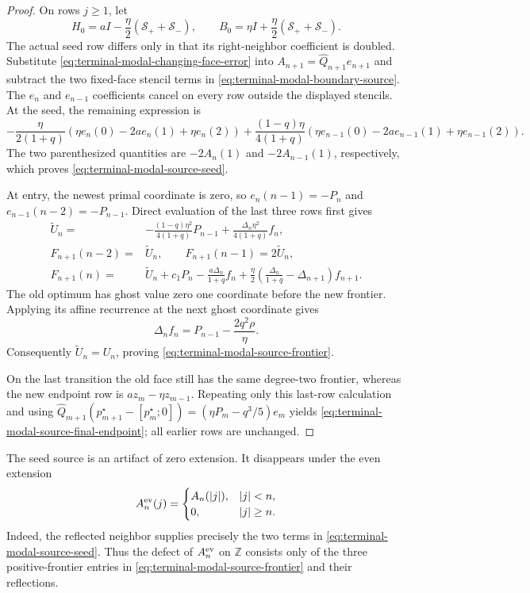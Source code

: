 \begin{proof}
On rows $j\ge1$, let
\[
 H_0=aI-\frac\eta2(\mathcal S_++\mathcal S_-),
 \qquad
 B_0=\eta I+\frac\eta2(\mathcal S_++\mathcal S_-).
\]
The actual seed row differs only in that its right-neighbor coefficient is
doubled.  Substitute
\eqref{eq:terminal-modal-changing-face-error} into
$A_{n+1}=\widehat Q_{n+1}e_{n+1}$ and subtract the two fixed-face stencil
terms in \eqref{eq:terminal-modal-boundary-source}.  The $e_n$ and
$e_{n-1}$ coefficients cancel on every row outside the displayed stencils.
At the seed, the remaining expression is
\[
 -\frac{\eta}{2(1+q)}
  (\eta e_n(0)-2ae_n(1)+\eta e_n(2))
 +\frac{(1-q)\eta}{4(1+q)}
  (\eta e_{n-1}(0)-2ae_{n-1}(1)+\eta e_{n-1}(2)).
\]
The two parenthesized quantities are $-2A_n(1)$ and
$-2A_{n-1}(1)$, respectively, which proves
\eqref{eq:terminal-modal-source-seed}.

At entry, the newest primal coordinate is zero, so
$e_n(n-1)=-P_n$ and $e_{n-1}(n-2)=-P_{n-1}$.  Direct evaluation of the last
three rows first gives
\[
 \begin{split}
 \widetilde U_n={}&
 -\frac{(1-q)\eta^2}{4(1+q)}P_{n-1}
 +\frac{\Delta_n\eta^2}{4(1+q)}f_n,\\
 F_{n+1}(n-2)={}&\widetilde U_n,\qquad
 F_{n+1}(n-1)=2\widetilde U_n,\\
 F_{n+1}(n)={}&\widetilde U_n+c_1P_n
 -\frac{a\Delta_n}{1+q}f_n
 +\frac\eta2\left(\frac{\Delta_n}{1+q}-\Delta_{n+1}\right)f_{n+1}.
 \end{split}
\]
The old optimum has ghost value zero one coordinate before the new
frontier.  Applying its affine recurrence at the next ghost coordinate gives
\begin{equation}
 \Delta_nf_n=P_{n-1}-\frac{2q^2\rho}{\eta}.
 \label{eq:terminal-modal-source-ghost-identity}
\end{equation}
Consequently $\widetilde U_n=U_n$, proving
\eqref{eq:terminal-modal-source-frontier}.

On the last transition the old face still has the same degree-two frontier,
whereas the new endpoint row is $az_m-\eta z_{m-1}$.  Repeating only this
last-row calculation and using
$\widehat Q_{m+1}(p_{m+1}^\star-[p_m^\star;0])
=(\eta P_m-q^3/5)e_m$ yields
\eqref{eq:terminal-modal-source-final-endpoint}; all earlier rows are
unchanged.
\end{proof}

The seed source is an artifact of zero extension.  It disappears under the
even extension
\begin{equation}
 A_n^{\rm ev}(j)=
 \begin{cases}
  A_n(|j|),& |j|<n,\\
  0,& |j|\ge n.
 \end{cases}
 \label{eq:terminal-modal-even-extension}
\end{equation}
Indeed, the reflected neighbor supplies precisely the two terms in
\eqref{eq:terminal-modal-source-seed}.  Thus the defect of
$A_n^{\rm ev}$ on $\mathbb Z$ consists only of the three positive-frontier
entries in \eqref{eq:terminal-modal-source-frontier} and their reflections.

